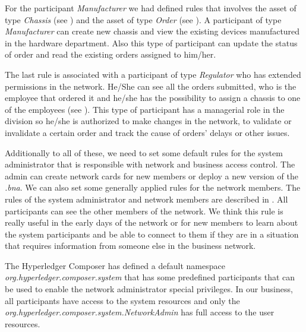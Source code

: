 For the participant \emph{Manufacturer} we had defined rules that involves the asset of type \emph{Chassis} (see ) and the asset of type \emph{Order} (see ). A participant of type \emph{Manufacturer} can create new chassis and view the existing devices manufactured in the hardware department. Also this type of participant can update the status of order and read the existing orders assigned to him/her.



The last rule is associated with a participant of type \emph{Regulator} who has extended permissions in the network. He/She can see all the orders submitted, who is the employee that ordered it and he/she has the possibility to assign a chassis to one of the employees (see ). This type of participant has a managerial role in the division so he/she is authorized to make changes in the network, to validate or invalidate a certain order and track the cause of orders' delays or other issues.


Additionally to all of these, we need to set some default rules for the system administrator that is responsible with network and business access control.  The admin can create network cards for new members or deploy a new version of the \emph{.bna}. We can also set some generally applied rules for the network members. The rules of the system administrator and network members are described in . All participants can see the other members of the network. We think this rule is really useful in the early days of the network or for new members to learn about the system participants and be able to connect to them if they are in a situation that requires information from someone else in the business network. 

The Hyperledger Composer has defined a default namespace \emph{org.hyperledger.composer.system} that has some predefined participants that can be used to enable the network administrator special privileges. In our business, all participants have access to the system resources and only the \emph{org.hyperledger.composer.system.NetworkAdmin} has full access to the user resources.

